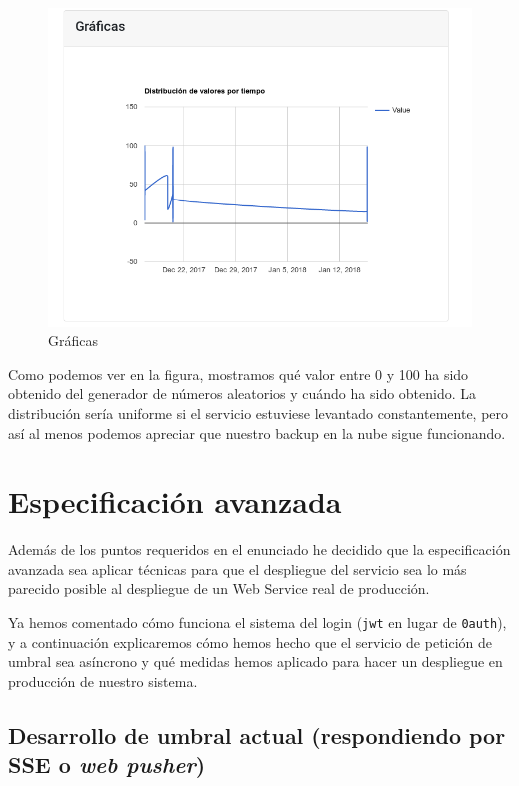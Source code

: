 \documentclass{article}
\begin{document}
\begin{figure}
\centering
\includegraphics[width=\textwidth]{graph.png}
\caption{Gráficas}
\end{figure}


Como podemos ver en la figura, mostramos qué valor entre 0 y 100 ha sido obtenido del generador de números aleatorios y cuándo ha sido obtenido. La distribución sería uniforme si el servicio estuviese levantado constantemente, pero así al menos podemos apreciar que nuestro backup en la nube sigue funcionando.

\section{Especificación avanzada}

Además de los puntos requeridos en el enunciado he decidido que la especificación avanzada sea aplicar técnicas para que el despliegue del servicio sea lo más parecido posible al despliegue de un Web Service real de producción.

Ya hemos comentado cómo funciona el sistema del login (\texttt{jwt} en lugar de \texttt{0auth}), y a continuación explicaremos cómo hemos hecho que el servicio de petición de umbral sea asíncrono y qué medidas hemos aplicado para hacer un despliegue en producción de nuestro sistema.

\subsection{Desarrollo de umbral actual (respondiendo por SSE o \emph{web pusher})}
\end{document}
